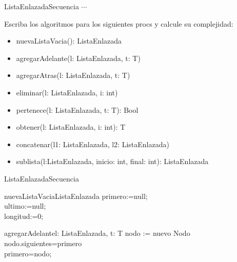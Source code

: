 \documentclass[a4paper,10pt]{article}
\begin{document}
\begin{design}{ListaEnlazada}{Secuencia}
    {\LARGE $\cdots$}
\end{design}
Escriba los algoritmos para los siguientes procs y calcule su complejidad:
\begin{itemize}
    \item nuevaListaVacia(): ListaEnlazada
    \item agregarAdelante(\Inout l: ListaEnlazada, \In t: T)
    \item agregarAtras(\Inout l: ListaEnlazada, \In t: T)
    \item eliminar(\Inout l: ListaEnlazada, \In i: int)
    \item pertenece(\In l: ListaEnlazada, \In t: T): Bool
    \item obtener(\In l: ListaEnlazada, \In i: int): T
    \item concatenar(\Inout l1: ListaEnlazada, \In l2: ListaEnlazada)
    \item sublista(\In l:ListaEnlazada, \In inicio: int, \In final: int): ListaEnlazada
\end{itemize}

\begin{design}{ListaEnlazada}{Secuencia}
    \begin{impl}{nuevaListaVacia}{}{ListaEnlazada}
        primero:=null;
        \\ultimo:=null;
        \\longitud:=0;
    \end{impl}
    \begin{impl}{agregarAdelante}{\Inout l: ListaEnlazada, \In t: T}{}
        nodo := nuevo Nodo
        \\nodo.siguientes=primero
        \\primero=nodo;
    \end{impl}
\end{design}
\end{document}
